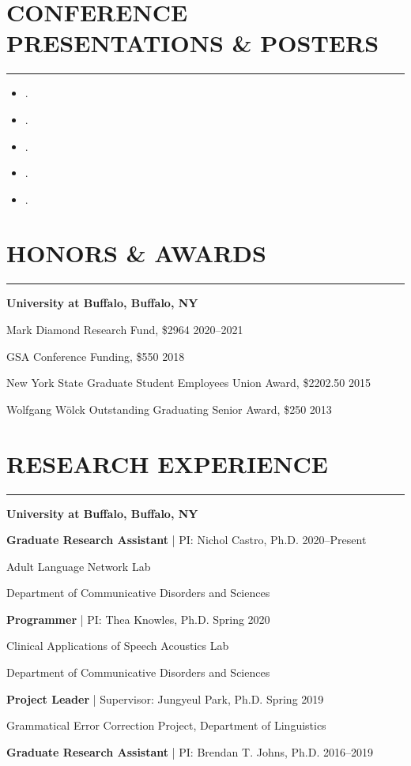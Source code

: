 \documentclass[11pt]{article}
\newcommand{\cvsection}[1]{\vspace{-0.2cm}\section*{\Large #1}\vspace{-0.2cm}\hrule\vspace{0.2cm}}
\newcommand{\h}[1]{\hspace{15pt} #1}
\begin{document}
\cvsection{CONFERENCE PRESENTATIONS \& POSTERS}

\begin{itemize}[leftmargin=!,labelindent=!,itemindent=-18pt]
    \setlength\itemsep{0.3em}

    \item[] .
    \item[] .
    \item[] .
    \item[] .
    \item[] .

\end{itemize}



\cvsection{HONORS \& AWARDS}

\textbf{\large University at Buffalo, Buffalo, NY}

Mark Diamond Research Fund, \$2964 \hfill 2020--2021

GSA Conference Funding, \$550 \hfill 2018

New York State Graduate Student Employees Union Award, \$2202.50 \hfill 2015

Wolfgang W{\"o}lck Outstanding Graduating Senior Award, \$250 \hfill 2013



\cvsection{RESEARCH EXPERIENCE}

\textbf{\large University at Buffalo, Buffalo, NY}

\textbf{Graduate Research Assistant} | PI: Nichol Castro, Ph.D. \hfill 2020--Present

\h{Adult Language Network Lab}

\h{Department of Communicative Disorders and Sciences}

\textbf{Programmer} | PI: Thea Knowles, Ph.D. \hfill Spring 2020

\h{Clinical Applications of Speech Acoustics Lab}

\h{Department of Communicative Disorders and Sciences}

\textbf{Project Leader} | Supervisor: Jungyeul Park, Ph.D. \hfill Spring 2019

\h{Grammatical Error Correction Project, Department of Linguistics}

\textbf{Graduate Research Assistant} | PI: Brendan T. Johns, Ph.D. \hfill 2016--2019
\end{document}

